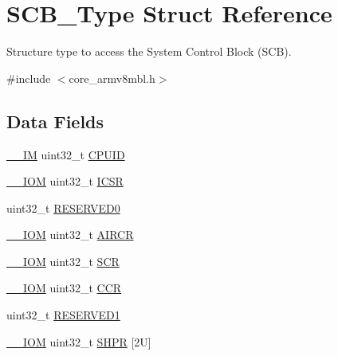 \hypertarget{struct_s_c_b___type}{}\section{S\+C\+B\+\_\+\+Type Struct Reference}
\label{struct_s_c_b___type}


Structure type to access the System Control Block (S\+CB).  




{\ttfamily \#include $<$core\+\_\+armv8mbl.\+h$>$}

\subsection*{Data Fields}
\begin{DoxyCompactItemize}
\item 
\mbox{\hyperlink{core__cm4_8h_a4cc1649793116d7c2d8afce7a4ffce43}{\+\_\+\+\_\+\+IM}} uint32\+\_\+t \mbox{\hyperlink{struct_s_c_b___type_adbf8292503748ba6421a523bdee6819d}{C\+P\+U\+ID}}
\item 
\mbox{\hyperlink{core__cm4_8h_ab6caba5853a60a17e8e04499b52bf691}{\+\_\+\+\_\+\+I\+OM}} uint32\+\_\+t \mbox{\hyperlink{struct_s_c_b___type_aced895d6aba03d72b0d865fcc5ce44ee}{I\+C\+SR}}
\item 
uint32\+\_\+t \mbox{\hyperlink{struct_s_c_b___type_af86c61a5d38a4fc9cef942a12744486b}{R\+E\+S\+E\+R\+V\+E\+D0}}
\item 
\mbox{\hyperlink{core__cm4_8h_ab6caba5853a60a17e8e04499b52bf691}{\+\_\+\+\_\+\+I\+OM}} uint32\+\_\+t \mbox{\hyperlink{struct_s_c_b___type_a9b6ccd9c0c0865f8facad77ea37240b0}{A\+I\+R\+CR}}
\item 
\mbox{\hyperlink{core__cm4_8h_ab6caba5853a60a17e8e04499b52bf691}{\+\_\+\+\_\+\+I\+OM}} uint32\+\_\+t \mbox{\hyperlink{struct_s_c_b___type_acac65f229cb3fcb5369a0a9e0393b8c0}{S\+CR}}
\item 
\mbox{\hyperlink{core__cm4_8h_ab6caba5853a60a17e8e04499b52bf691}{\+\_\+\+\_\+\+I\+OM}} uint32\+\_\+t \mbox{\hyperlink{struct_s_c_b___type_ad68b5c1f2d9845ef4247cf2d9b041336}{C\+CR}}
\item 
uint32\+\_\+t \mbox{\hyperlink{struct_s_c_b___type_ac4ac04e673b5b8320d53f7b0947db902}{R\+E\+S\+E\+R\+V\+E\+D1}}
\item 
\mbox{\hyperlink{core__cm4_8h_ab6caba5853a60a17e8e04499b52bf691}{\+\_\+\+\_\+\+I\+OM}} uint32\+\_\+t \mbox{\hyperlink{struct_s_c_b___type_a67fd6058e3196a723d64df2d22ae6daa}{S\+H\+PR}} \mbox{[}2\+U\mbox{]}
\item 

\end{DoxyCompactItemize}
